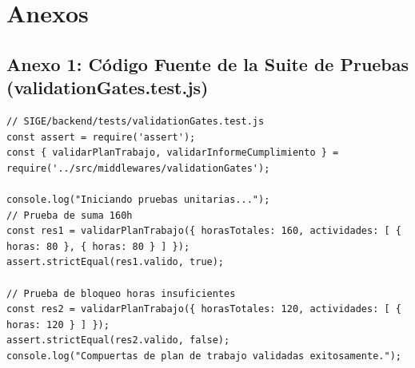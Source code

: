 \documentclass[12pt,a4paper]{article}
\begin{document}
\vspace{0.4cm}

\section{Anexos}

\subsection*{Anexo 1: Código Fuente de la Suite de Pruebas (validationGates.test.js)}
\begin{lstlisting}
// SIGE/backend/tests/validationGates.test.js
const assert = require('assert');
const { validarPlanTrabajo, validarInformeCumplimiento } = require('../src/middlewares/validationGates');

console.log("Iniciando pruebas unitarias...");
// Prueba de suma 160h
const res1 = validarPlanTrabajo({ horasTotales: 160, actividades: [ { horas: 80 }, { horas: 80 } ] });
assert.strictEqual(res1.valido, true);

// Prueba de bloqueo horas insuficientes
const res2 = validarPlanTrabajo({ horasTotales: 120, actividades: [ { horas: 120 } ] });
assert.strictEqual(res2.valido, false);
console.log("Compuertas de plan de trabajo validadas exitosamente.");
\end{lstlisting}
\end{document}

